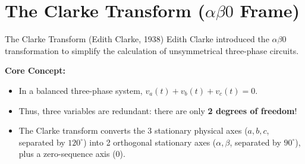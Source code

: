 \section{\texorpdfstring{The Clarke Transform ($\alpha\beta0$ Frame)}{The Clarke Transform (alpha-beta-0 Frame)}}

\begin{frame}[allowframebreaks]{\texorpdfstring{The Clarke Transform (Edith Clarke, 1938)}{The Clarke Transform (Edith Clarke, 1938)}}
    Edith Clarke introduced the $\alpha\beta0$ transformation to simplify the calculation of unsymmetrical three-phase circuits.

    \textbf{Core Concept:}
    \begin{itemize}
        \item In a balanced three-phase system, $v_a(t) + v_b(t) + v_c(t) = 0$.
        \item Thus, three variables are redundant: there are only \textbf{2 degrees of freedom}!
        \item The Clarke transform converts the 3 stationary physical axes ($a, b, c$, separated by $120^\circ$) into 2 orthogonal stationary axes ($\alpha, \beta$, separated by $90^\circ$), plus a zero-sequence axis ($0$).
    \end{itemize}

    \begin{center}
    \end{center}
\end{frame}

